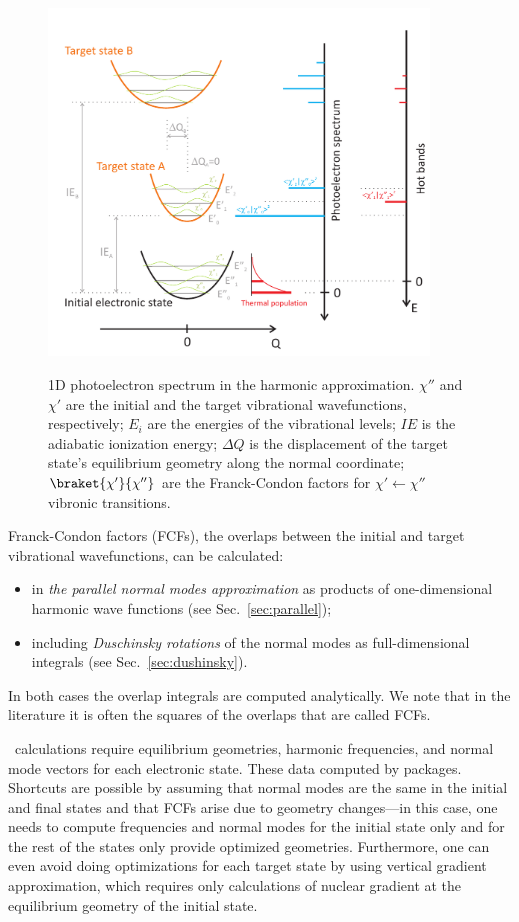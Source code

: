 \documentclass[11pt]{article}
\begin{document}
\begin{figure}[h!]
  \centering
  \caption{1D photoelectron spectrum in the harmonic approximation.
$\chi''$ and $\chi'$ are the initial and the target vibrational wavefunctions, respectively;
$E_i$ are the energies of the vibrational levels;
$IE$ is the adiabatic ionization energy;
$\Delta Q$ is the displacement of the
target state's equilibrium geometry along the normal coordinate;
$\braket{\chi'}{\chi''}$ are the Franck-Condon factors for $\chi'\leftarrow \chi''$
vibronic transitions.}
  \includegraphics[width=0.9\textwidth]{fcfs_1d.pdf}
  \label{fig:fcfs}
\end{figure}

Franck-Condon factors (FCFs), the overlaps between the initial and target
vibrational wavefunctions, can be calculated:
\begin{itemize} 
\item in {\em the parallel normal modes approximation} as products of 
one-dimensional harmonic wave functions (see Sec.~\ref{sec:parallel});
\item including {\em Duschinsky rotations} of the normal modes as full-dimensional integrals (see Sec.~\ref{sec:dushinsky}).
\end{itemize}
In both cases the overlap integrals are computed analytically.  We note that in the literature it is often the squares of the overlaps that are called FCFs.

\ezFCF\ calculations require equilibrium geometries, harmonic frequencies, 
and normal mode vectors for each electronic state. These data computed by \ai packages.
Shortcuts are possible by assuming that normal modes are the same in the initial and final
states and that FCFs arise due to geometry changes---in this case, one needs to compute frequencies and
normal modes for the initial state only and for the rest of the states only provide optimized geometries.
Furthermore, one can even avoid doing optimizations for each target state by using vertical gradient
approximation, which requires only calculations of nuclear gradient at the equilibrium geometry of the initial state.
\end{document}
